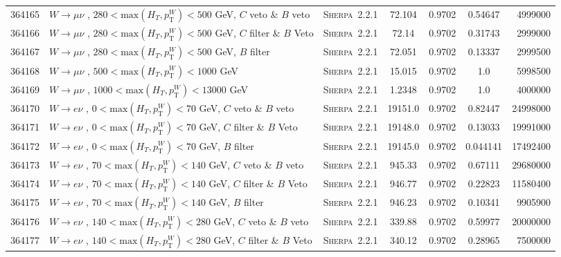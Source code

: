 \begin{table}[!htb]
{\begin{tabular}{|c|l|c|c|c|c|r|}
      364165 & $W \to \mu\nu $ , $280<\text{max}(H_T,p_{\text{T}}^W)<500$ GeV, $C$ veto \& $B$ veto & \textsc{Sherpa}~2.2.1 &   72.104         & 0.9702& 0.54647 &  4999000 \\
      364166 & $W \to \mu\nu $ , $280<\text{max}(H_T,p_{\text{T}}^W)<500$ GeV,  $C$ filter \& $B$ Veto & \textsc{Sherpa}~2.2.1 &72.14          & 0.9702& 0.31743 &  2999000 \\
      364167 & $W \to \mu\nu $ , $280<\text{max}(H_T,p_{\text{T}}^W)<500$ GeV, $B$ filter & \textsc{Sherpa}~2.2.1 &             72.051         & 0.9702& 0.13337 &  2999500 \\
      364168 & $W \to \mu\nu $ , $500<\text{max}(H_T,p_{\text{T}}^W)<1000$ GeV                      & \textsc{Sherpa}~2.2.1 &   15.015         & 0.9702& 1.0 	&  5998500 \\
      364169 & $W \to \mu\nu $ , $1000<\text{max}(H_T,p_{\text{T}}^W)<13000$ GeV                       & \textsc{Sherpa}~2.2.1 &1.2348         & 0.9702& 1.0     &  4000000 \\
      \hline
      364170 & $W \to e\nu $ , $0<\text{max}(H_T,p_{\text{T}}^W)<70$ GeV, $C$ veto \& $B$ veto & \textsc{Sherpa}~2.2.1 &        19151.0        & 0.9702& 0.82447 &  24998000\\
      364171 & $W \to e\nu $ , $0<\text{max}(H_T,p_{\text{T}}^W)<70$ GeV,  $C$ filter \& $B$ Veto & \textsc{Sherpa}~2.2.1 &     19148.0        & 0.9702& 0.13033 &  19991000\\
      364172 & $W \to e\nu $ , $0<\text{max}(H_T,p_{\text{T}}^W)<70$ GeV, $B$ filter & \textsc{Sherpa}~2.2.1 &                  19145.0        & 0.9702& 0.044141&  17492400\\
      364173 & $W \to e\nu $ , $70<\text{max}(H_T,p_{\text{T}}^W)<140$ GeV, $C$ veto \& $B$ veto & \textsc{Sherpa}~2.2.1 &      945.33         & 0.9702& 0.67111 &  29680000\\
      364174 & $W \to e\nu $ , $70<\text{max}(H_T,p_{\text{T}}^W)<140$ GeV,  $C$ filter \& $B$ Veto & \textsc{Sherpa}~2.2.1 &   946.77         & 0.9702& 0.22823 &  11580400\\
      364175 & $W \to e\nu $ , $70<\text{max}(H_T,p_{\text{T}}^W)<140$ GeV, $B$ filter & \textsc{Sherpa}~2.2.1 &                946.23         & 0.9702& 0.10341 &  9905900 \\
      364176 & $W \to e\nu $ , $140<\text{max}(H_T,p_{\text{T}}^W)<280$ GeV, $C$ veto \& $B$ veto & \textsc{Sherpa}~2.2.1 &     339.88         & 0.9702& 0.59977 &  20000000\\
      364177 & $W \to e\nu $ , $140<\text{max}(H_T,p_{\text{T}}^W)<280$ GeV,  $C$ filter \& $B$ Veto & \textsc{Sherpa}~2.2.1 &  340.12         & 0.9702& 0.28965 &  7500000 \\

\end{tabular}}
\end{table}
